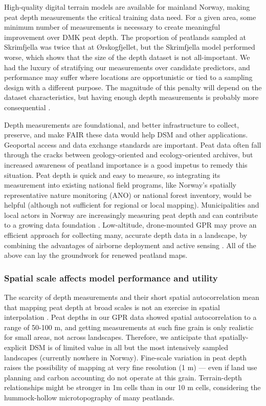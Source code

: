 \documentclass[soil, manuscript]{copernicus}
\begin{document}
High-quality digital terrain models are available for mainland Norway, making peat depth measurements the critical training data need.
For a given area, some minimum number of measurements is necessary to create meaningful improvement over DMK peat depth.
The proportion of peatlands sampled at Skrimfjella was twice that at Ørskogfjellet, but the Skrimfjella model performed worse, which shows that the size of the depth dataset is not all-important.
We had the luxury of stratifying our measurements over candidate predictors, and performance may suffer where locations are opportunistic or tied to a sampling design with a different purpose.
The magnitude of this penalty will depend on the dataset characteristics, but having enough depth measurements is probably more consequential \citep{wadouxSamplingDesignOptimization2019}.

Depth measurements are foundational, and better infrastructure to collect, preserve, and make FAIR these data would help DSM and other applications.
Geoportal access and data exchange standards \citeyearpar[like Natural England's for peat surveys,][]{naturalenglandDataExchangeStandard2023} are important.
Peat data often fall through the cracks between geology-oriented and ecology-oriented archives, but increased awareness of peatland importance is a good impetus to remedy this situation.
Peat depth is quick and easy to measure, so integrating its measurement into existing national field programs, like Norway's spatially representative nature monitoring (ANO) or national forest inventory, would be helpful (although not sufficient for regional or local mapping).
Municipalities and local actors in Norway are increasingly measuring peat depth and can contribute to a growing data foundation \citep{kyrkjeeideCalculatorLocalPeatland2023}.
Low-altitude, drone-mounted GPR may prove an efficient approach for collecting many, accurate depth data in a landscape, by combining the advantages of airborne deployment and active sensing \citep{pelletierPeatAnalysesHudson1991, ruolsDevelopmentDronebasedGroundpenetrating2023}.
All of the above can lay the groundwork for renewed peatland maps.

\subsubsection{Spatial scale affects model performance and utility}

The scarcity of depth measurements and their short spatial autocorrelation mean that mapping peat depth at broad scales is not an exercise in spatial interpolation \citep{henglGenericFrameworkSpatial2004}.
Peat depths in our GPR data showed spatial autocorrelation to a range of 50-100 m, and getting measurements at such fine grain is only realistic for small areas, not across landscapes.
Therefore, we anticipate that spatially-explicit DSM is of limited value in all but the most intensively sampled landscapes (currently nowhere in Norway).
Fine-scale variation in peat depth raises the possibility of mapping at very fine resolution (1 m) --- even if land use planning and carbon accounting do not operate at this grain.
Terrain-depth relationships might be stronger in 1m cells than in our 10 m cells, considering the hummock-hollow microtopography of many peatlands.
\end{document}
